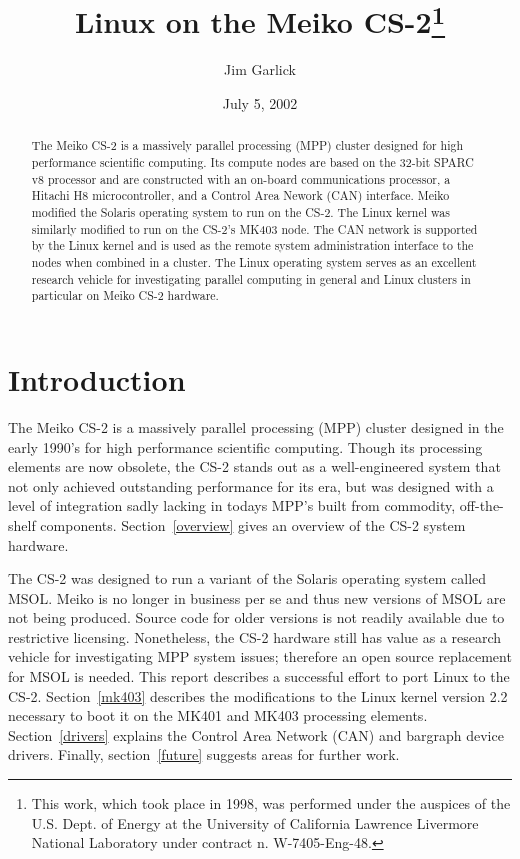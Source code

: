 \documentclass{article}
\author{Jim Garlick}
\title{Linux on the Meiko CS-2\footnote{
This work, which took place in 1998, was performed under the auspices of the 
U.S. Dept. of Energy at the University of California Lawrence Livermore 
National Laboratory under contract n. W-7405-Eng-48.}}
\date{July 5, 2002}
\begin{document}
\maketitle

\begin{abstract}

  The Meiko CS-2 is a massively parallel processing (MPP) cluster designed 
for high performance scientific computing.  
Its compute nodes are based on the 32-bit SPARC v8 processor and are 
constructed with an on-board communications processor, a Hitachi H8 
microcontroller, and a Control Area Nework (CAN) interface.
Meiko modified the Solaris operating system to run on the CS-2.
The Linux kernel was similarly modified to run on the CS-2's MK403 node.
The CAN network is supported by the Linux kernel and is used as the remote
system administration interface to the nodes when combined in a cluster.
The Linux operating system serves as an excellent research vehicle for 
investigating parallel computing in general and Linux clusters in particular 
on Meiko CS-2 hardware.

\end{abstract}

\section{Introduction}

  The Meiko CS-2 is a massively parallel processing (MPP) cluster designed 
in the early 1990's for high performance scientific computing.  Though its
processing elements are now obsolete,
the CS-2 stands out as a well-engineered system that 
not only achieved outstanding performance for its era, but was designed with 
a level of integration sadly lacking in todays MPP's built from commodity, 
off-the-shelf components.  Section~\ref{overview} gives an overview
of the CS-2 system hardware.

  The CS-2 was designed to run a variant of the Solaris operating system 
called MSOL.  Meiko is no longer in business per se and thus new versions 
of MSOL are not being produced.  Source code for older versions is not
readily available due to restrictive licensing.  Nonetheless, the CS-2 
hardware still has value as a research vehicle for investigating MPP system 
issues;  therefore an open source replacement for MSOL is needed.  
This report describes a successful effort to port Linux to the CS-2.  
Section~\ref{mk403} describes the modifications to the Linux kernel 
version 2.2 necessary to boot it on the MK401 and MK403 processing 
elements.  
Section~\ref{drivers} explains the Control Area Network (CAN) 
and bargraph device drivers.
Finally, section~\ref{future} suggests areas for further work.
\end{document}
